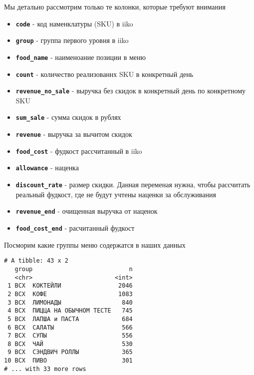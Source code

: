 \documentclass[
  letterpaper,
  DIV=11,
  numbers=noendperiod]{scrreport}
\begin{document}
\begin{tcolorbox}[enhanced jigsaw, colframe=quarto-callout-note-color-frame, leftrule=.75mm, colback=white, arc=.35mm, toprule=.15mm, opacityback=0, bottomrule=.15mm, breakable, left=2mm, rightrule=.15mm]
\begin{minipage}[t]{5.5mm}
\textcolor{quarto-callout-note-color}{\faInfo}
\end{minipage}%
\begin{minipage}[t]{\textwidth - 5.5mm}
Мы детально рассмотрим только те колонки, которые требуют
внимания\end{minipage}%
\end{tcolorbox}

\begin{itemize}
\item
  \textbf{\texttt{code}} - код наменклатуры (SKU) в iiko
\item
  \textbf{\texttt{group}} - группа первого уровня в iiko
\item
  \textbf{\texttt{food\_name}} - наименоание позиции в меню
\item
  \textbf{\texttt{count}} - количество реализованнх SKU в конкретный
  день
\item
  \textbf{\texttt{revenue\_no\_sale}} - выручка без скидок в конкретный
  день по конкретному SKU
\item
  \textbf{\texttt{sum\_sale}} - сумма скидок в рублях
\item
  \textbf{\texttt{revenue}} - выручка за вычитом скидок
\item
  \textbf{\texttt{food\_cost}} - фудкост рассчитанный в iiko
\item
  \textbf{\texttt{allowance}} - наценка
\item
  \textbf{\texttt{discount\_rate}} - размер скидки. Данная переменая
  нужна, чтобы рассчитать реальный фудкост, где не будут учтены наценки
  за обслуживания
\item
  \textbf{\texttt{revenue\_end}} - очищенная выручка от наценок
\item
  \textbf{\texttt{food\_cost\_end}} - расчитанный фудкост
\end{itemize}

Посморим какие группы меню содержатся в наших данных

\begin{verbatim}
# A tibble: 43 x 2
   group                           n
   <chr>                       <int>
 1 ВСХ  КОКТЕЙЛИ                2046
 2 ВСХ  КОФЕ                    1083
 3 ВСХ  ЛИМОНАДЫ                 840
 4 ВСХ  ПИЦЦА НА ОБЫЧНОМ ТЕСТЕ   745
 5 ВСХ  ЛАПША и ПАСТА            684
 6 ВСХ  САЛАТЫ                   566
 7 ВСХ  СУПЫ                     556
 8 ВСХ  ЧАЙ                      530
 9 ВСХ  СЭНДВИЧ РОЛЛЫ            365
10 ВСХ  ПИВО                     301
# ... with 33 more rows
\end{verbatim}
\end{document}
